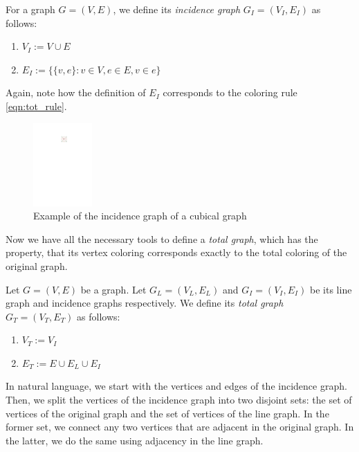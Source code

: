 \begin{defn}
    For a graph $G = (V, E)$, we define its \emph{incidence graph} $G_I = (V_I, E_I)$ as follows:
    \begin{enumerate}
        \item $V_I := V \cup E$
        \item $E_I := \{ \{v, e\} : v \in V, e \in E, v \in e \}$
    \end{enumerate}
\end{defn}

Again, note how the definition of $E_I$ corresponds to the coloring rule \ref{eqn:tot_rule}.

\begin{figure}[H]
    \centering
    \includegraphics[width=0.2\textwidth]{../Resources/Figs/cubical_incid_graph.pdf}
    \caption{Example of the incidence graph of a cubical graph}
    \label{fig:cubical_incid_graph}
\end{figure}

Now we have all the necessary tools to define a \textit{total graph}, which has the property, that its vertex coloring corresponds exactly to the total coloring of the original graph.

\begin{defn}
    Let $G = (V, E)$ be a graph. Let $G_L = (V_L, E_L)$ and $G_I = (V_I, E_I)$ be its line graph and incidence graphs respectively. We define its \emph{total graph} $G_T = (V_T, E_T)$ as follows:
    \begin{enumerate}
        \item $V_T := V_I$
        \item $E_T := E \cup E_L \cup E_I$
    \end{enumerate}
\end{defn}

In natural language, we start with the vertices and edges of the incidence graph. Then, we split the vertices of the incidence graph into two disjoint sets: the set of vertices of the original graph and the set of vertices of the line graph. In the former set, we connect any two vertices that are adjacent in the original graph. In the latter, we do the same using adjacency in the line graph.

